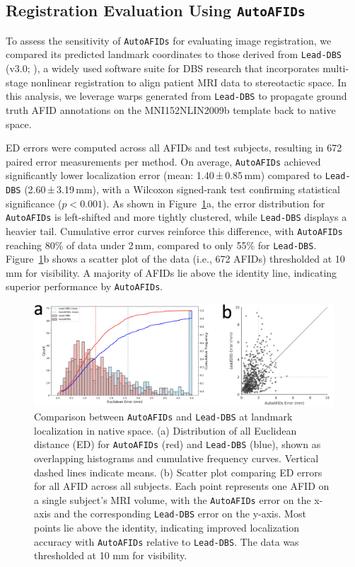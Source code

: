 \subsection{Registration Evaluation Using \texttt{AutoAFIDs}}
To assess the sensitivity of \texttt{AutoAFIDs} for evaluating image registration, we compared its predicted landmark coordinates to those derived from \texttt{Lead-DBS} (v3.0; \cite{Neudorfer2023-wd}), a widely used software suite for DBS research that incorporates multi-stage nonlinear registration to align patient MRI data to stereotactic space. In this analysis, we leverage warps generated from \texttt{Lead-DBS} to propagate ground truth AFID annotations on the MNI152NLIN2009b template back to native space.

ED errors were computed across all AFIDs and test subjects, resulting in 672 paired error measurements per method. On average, \texttt{AutoAFIDs} achieved significantly lower localization error (mean: 1.40\,±\,0.85\,mm) compared to \texttt{Lead-DBS} (2.60\,±\,3.19\,mm), with a Wilcoxon signed-rank test confirming statistical significance (\(p < 0.001\)). As shown in Figure~\ref{fig:ch3_Figure_cnnvslead1}a, the error distribution for \texttt{AutoAFIDs} is left-shifted and more tightly clustered, while \texttt{Lead-DBS} displays a heavier tail. Cumulative error curves reinforce this difference, with \texttt{AutoAFIDs} reaching 80\% of data under 2\,mm, compared to only 55\% for \texttt{Lead-DBS}. Figure~\ref{fig:ch3_Figure_cnnvslead1}b shows a scatter plot of the data (i.e., 672 AFIDs) thresholded at 10 mm for visibility. A majority of AFIDs lie above the identity line, indicating superior performance by \texttt{AutoAFIDs}.

\begin{figure}[hbt!]
    \centering
    \includegraphics[width=1\linewidth]{figs/ch3_Figure_cnnvslead1.png}
    \caption{Comparison between \texttt{AutoAFIDs} and \texttt{Lead-DBS} at landmark localization in native space. (a) Distribution of all Euclidean distance (ED) for \texttt{AutoAFIDs} (red) and \texttt{Lead-DBS} (blue), shown as overlapping histograms and cumulative frequency curves. Vertical dashed lines indicate means. (b) Scatter plot comparing ED errors for all AFID across all subjects. Each point represents one AFID on a single subject's MRI volume, with the \texttt{AutoAFIDs} error on the x-axis and the corresponding \texttt{Lead-DBS} error on the y-axis. Most points lie above the identity, indicating improved localization accuracy with \texttt{AutoAFIDs} relative to \texttt{Lead-DBS}. The data was thresholded at 10 mm for visibility.}
    \label{fig:ch3_Figure_cnnvslead1}
\end{figure}

